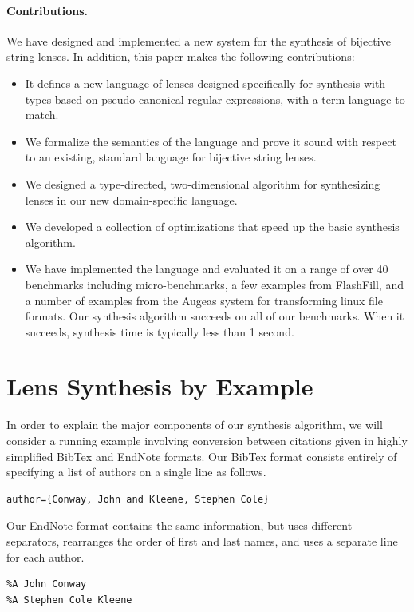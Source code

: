 \documentclass[numbers]{sigplanconf}
\begin{document}
\paragraph*{Contributions.}  We have designed and implemented
a new system for the synthesis of bijective string lenses.
In addition, this paper makes the following contributions:

\begin{itemize}
\item It defines a new language of lenses designed specifically for synthesis
with types based on pseudo-canonical regular expressions, with a term 
language to match.
\item We formalize the semantics of the language and prove it sound with
respect to an existing, standard language for bijective string lenses.
\item We designed a type-directed, two-dimensional 
algorithm for synthesizing lenses in our new domain-specific language.
\item We developed a collection of optimizations that speed up the basic
synthesis algorithm.
\item We have implemented the language and evaluated it on a range of
over 40 benchmarks including micro-benchmarks, a few examples from FlashFill,
and a number of examples from the Augeas system for transforming linux
file formats.  Our synthesis algorithm succeeds on all of our
benchmarks.  When it succeeds, synthesis time is typically less than 1 second.
\end{itemize}

\section{Lens Synthesis by Example}

In order to explain the major components of our synthesis algorithm,
we will consider a running example involving conversion between citations given
in highly simplified BibTex and EndNote formats.  Our BibTex format
consists entirely of specifying a list of authors on a single line as follows.
\begin{lstlisting}
author={Conway, John and Kleene, Stephen Cole}
\end{lstlisting}
Our EndNote format contains the same information, but uses different separators,
rearranges the order of first and last names, and uses a separate line for each
author. 
\begin{lstlisting}
%A John Conway
%A Stephen Cole Kleene
\end{lstlisting}
\end{document}
